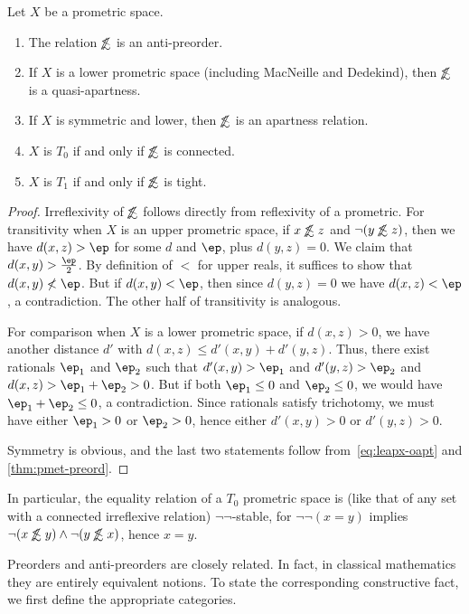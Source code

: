 \documentclass{article}
\def\oapt{\mathrel{\!\not\,\not\lesssim}}
\def\hfep{\frac{\ep}{2}}
\def\nn{\ensuremath{\neg\neg}}
\begin{document}
\begin{thm}\label{thm:pmet-apreord}
  Let $X$ be a prometric space.
  \begin{enumerate}
  \item The relation $\oapt$ is an anti-preorder.
  \item If $X$ is a lower prometric space (including MacNeille and Dedekind), then $\oapt$ is a quasi-apartness.
  \item If $X$ is symmetric and lower, then $\oapt$ is an apartness relation.
  \item $X$ is $T_0$ if and only if $\oapt$ is connected.
  \item $X$ is $T_1$ if and only if $\oapt$ is tight.
  \end{enumerate}
\end{thm}
\begin{proof}
  Irreflexivity of $\oapt$ follows directly from reflexivity of a prometric.
  For transitivity when $X$ is an upper prometric space, if $x\oapt z$ and $\neg (y\oapt z)$, then we have $d(x,z)>\ep$ for some $d$ and $\ep$, plus $d(y,z)=0$.
  We claim that $d(x,y)>\hfep$.
  By definition of $<$ for upper reals, it suffices to show that $d(x,y) \not< \ep$.
  But if $d(x,y)<\ep$, then since $d(y,z)=0$ we have $d(x,z)<\ep$, a contradiction.
  The other half of transitivity is analogous.

  For comparison when $X$ is a lower prometric space, if $d(x,z)>0$, we have another distance $d'$ with $d(x,z) \le d'(x,y)+d'(y,z)$.
  Thus, there exist rationals $\ep_1$ and $\ep_2$ such that $d'(x,y)>\ep_1$ and $d'(y,z)>\ep_2$ and $d(x,z) > \ep_1+\ep_2 > 0$.
  But if both $\ep_1\le 0$ and $\ep_2\le 0$, we would have $\ep_1+\ep_2\le 0$, a contradiction.
  Since rationals satisfy trichotomy, we must have either $\ep_1>0$ or $\ep_2>0$, hence either $d'(x,y)>0$ or $d'(y,z)>0$.

  Symmetry is obvious, and the last two statements follow from~\eqref{eq:leapx-oapt} and \cref{thm:pmet-preord}.
\end{proof}

In particular, the equality relation of a $T_0$ prometric space is (like that of any set with a connected irreflexive relation) \nn-stable, for $\neg\neg(x=y)$ implies $\neg(x\oapt y)\land \neg(y\oapt x)$, hence $x=y$.

Preorders and anti-preorders are closely related.
In fact, in classical mathematics they are entirely equivalent notions.
To state the corresponding constructive fact, we first define the appropriate categories.
\end{document}
